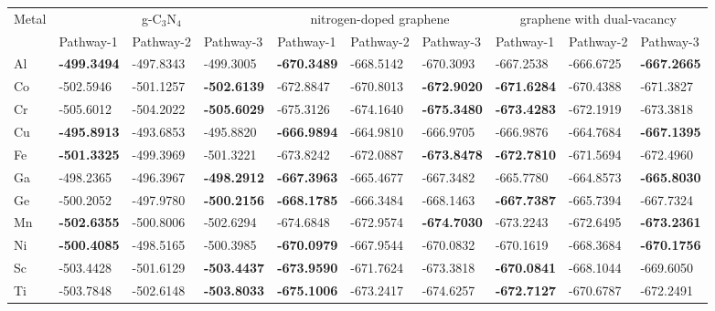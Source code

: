 \begin{table}[h]
  \centering
  {\fontsize{6}{12}\selectfont
  \begin{tabular}{*{10}{l}}
      \hline
      \multirow{2}{*}{Metal} & \multicolumn{3}{c}{g-C$_3$N$_4$}  & \multicolumn{3}{c}{nitrogen-doped graphene} & \multicolumn{3}{c}{graphene with dual-vacancy}               \\ \cline{2-10}
                             & Pathway-1 & Pathway-2 & Pathway-3 & Pathway-1 & Pathway-2 & Pathway-3           & Pathway-1 & Pathway-2 & Pathway-3  \\
      \hline
      Al & \textbf{-499.3494} & -497.8343 & -499.3005 & \textbf{-670.3489} & -668.5142 & -670.3093 & -667.2538 & -666.6725 & \textbf{-667.2665} \\
      Co & -502.5946 & -501.1257 & \textbf{-502.6139} & -672.8847 & -670.8013 & \textbf{-672.9020} & \textbf{-671.6284} & -670.4388 & -671.3827 \\
      Cr & -505.6012 & -504.2022 & \textbf{-505.6029} & -675.3126 & -674.1640 & \textbf{-675.3480} & \textbf{-673.4283} & -672.1919 & -673.3818 \\
      Cu & \textbf{-495.8913} & -493.6853 & -495.8820 & \textbf{-666.9894} & -664.9810 & -666.9705 & -666.9876 & -664.7684 & \textbf{-667.1395} \\
      Fe & \textbf{-501.3325} & -499.3969 & -501.3221 & -673.8242 & -672.0887 & \textbf{-673.8478} & \textbf{-672.7810} & -671.5694 & -672.4960 \\
      Ga & -498.2365 & -496.3967 & \textbf{-498.2912} & \textbf{-667.3963} & -665.4677 & -667.3482 & -665.7780 & -664.8573 & \textbf{-665.8030} \\
      Ge & -500.2052 & -497.9780 & \textbf{-500.2156} & \textbf{-668.1785} & -666.3484 & -668.1463 & \textbf{-667.7387} & -665.7394 & -667.7324 \\
      Mn & \textbf{-502.6355} & -500.8006 & -502.6294 & -674.6848 & -672.9574 & \textbf{-674.7030} & -673.2243 & -672.6495 & \textbf{-673.2361} \\
      Ni & \textbf{-500.4085} & -498.5165 & -500.3985 & \textbf{-670.0979} & -667.9544 & -670.0832 & -670.1619 & -668.3684 & \textbf{-670.1756} \\
      Sc & -503.4428 & -501.6129 & \textbf{-503.4437} & \textbf{-673.9590} & -671.7624 & -673.3818 & \textbf{-670.0841} & -668.1044 & -669.6050 \\
      Ti & -503.7848 & -502.6148 & \textbf{-503.8033} & \textbf{-675.1006} & -673.2417 & -674.6257 & \textbf{-672.7127} & -670.6787 & -672.2491 \\

\end{tabular}}
\end{table}
